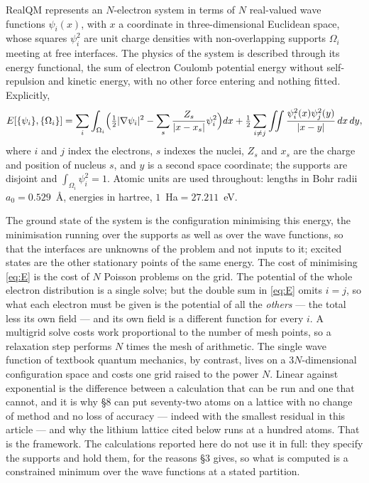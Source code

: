 \documentclass[11pt]{article}
\newcommand{\grad}{\nabla}
\newcommand{\half}{\tfrac12}
\begin{document}
RealQM represents an $N$-electron system in terms of $N$ real-valued wave functions $\psi_i(x)$,
with $x$ a coordinate in three-dimensional Euclidean space, whose squares $\psi_i^2$ are unit charge
densities with non-overlapping supports $\Omega_i$ meeting at free interfaces. The physics of the system is described through its energy functional, the sum of
electron Coulomb potential energy without self-repulsion and kinetic energy, with no other force entering and nothing fitted. Explicitly,
\begin{equation}\label{eq:E}
E[\{\psi_i\},\{\Omega_i\}]=\sum_i\int_{\Omega_i}\Bigl(\half|\grad\psi_i|^2
-\sum_s\frac{Z_s}{|x-x_s|}\psi_i^2\Bigr)dx
+\half\sum_{i\neq j}\iint\frac{\psi_i^2(x)\psi_j^2(y)}{|x-y|}\,dx\,dy,
\end{equation}
where $i$ and $j$ index the electrons, $s$ indexes the nuclei, $Z_s$ and $x_s$ are the charge and
position of nucleus $s$, and $y$ is a second space coordinate; the supports are disjoint and
$\int_{\Omega_i}\psi_i^2=1$. Atomic
units are used throughout: lengths in Bohr radii $a_0=0.529$~\AA, energies in hartree,
$1$~Ha${}=27.211$~eV.

The ground state of the system is the configuration minimising this energy, the minimisation running
over the supports as well as over the wave functions, so that the interfaces are unknowns of the
problem and not inputs to it; excited states are the other stationary points of the same energy. The
cost of minimising \eqref{eq:E} is the cost of $N$ Poisson problems on the grid. The potential of the
whole electron distribution is a single solve; but the double sum in \eqref{eq:E} omits $i=j$, so
what each electron must be given is the potential of all the \emph{others} --- the total less its own
field --- and its own field is a different function for every $i$. A multigrid solve costs work
proportional to the number of mesh points, so a relaxation step performs $N$ times the mesh of
arithmetic. The single wave function of textbook quantum mechanics, by contrast, lives on a $3N$-dimensional
configuration space and costs one grid raised to the power $N$. Linear against
exponential is the difference between a calculation that can be run and one that cannot, and it is
why \S8 can put seventy-two atoms on a lattice with no change of method and no loss of accuracy ---
indeed with the smallest residual in this article --- and why the lithium lattice cited below runs
at a hundred atoms. That is the framework. The
calculations reported here do not use it in full: they specify the supports and hold them, for the
reasons \S3 gives, so what is computed is a constrained minimum over the wave functions at a stated
partition.
\end{document}
